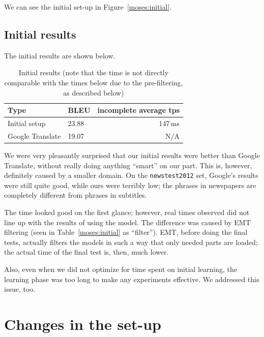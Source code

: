 We can see the initial set-up in Figure~\ref{moses:initial}.
\subsection{Initial results}

The initial results are shown below.

\begin{table}[h]
\begin{center}
\begin{tabular}{|l|l|r|}
    \hline
    \textbf{Type} & \textbf{BLEU} & \textbf{incomplete average tps} \\ \hline
    Initial setup & 23.88 & 147\,ms \\ \hline
    Google Translate & 19.07 & N/A \\  \hline
\end{tabular}
\end{center}

\caption{Initial results (note that the time is not directly comparable with the times below due to the pre-filtering, as described below)}\label{moses:initialresults}
\end{table}

We were very pleasantly surprised that our initial results were better than Google Translate, without really doing anything ``smart'' on our part. This is, however, definitely caused by a smaller domain. On the \texttt{newstest2012} set, Google's results were still quite good, while ours were terribly low; the phrases in newspapers are completely different from phrases in subtitles.

The time looked good on the first glance; however, real times observed did not line up with the results of using the model. The difference was caused by EMT filtering (seen in Table~\ref{moses:initial} as ``filter''). EMT, before doing the final tests, actually filters the models in such a way that only needed parts are loaded; the actual time of the final test is, then, much lower.

Also, even when we did not optimize for time spent on initial learning, the learning phase was too long to make any experiments effective. We addressed this issue, too.

\section{Changes in the set-up}
